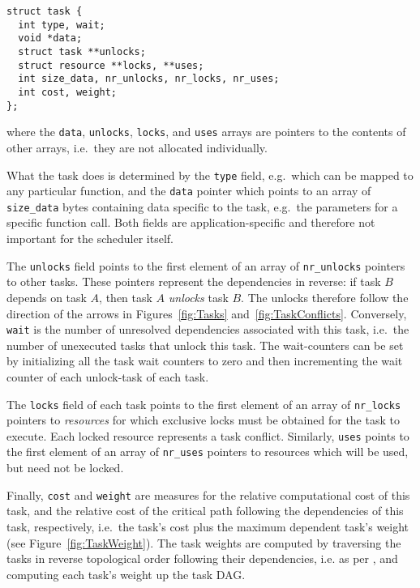 \documentclass[preprint]{elsarticle}
\newcommand{\fig}[1]
    {Figure~\ref{fig:#1}}
\newcommand{\figs}[2]
    {Figures~\ref{fig:#1} and~\ref{fig:#2}}
\begin{document}
\begin{center}\begin{minipage}{0.9\textwidth}
    \begin{lstlisting}
struct task {
  int type, wait;
  void *data;
  struct task **unlocks;
  struct resource **locks, **uses;
  int size_data, nr_unlocks, nr_locks, nr_uses;
  int cost, weight;
};
    \end{lstlisting}
\end{minipage}\end{center}
\noindent where the {\tt data}, {\tt unlocks}, {\tt locks},
and {\tt uses} arrays are pointers to the contents of other
arrays, i.e.~they are not allocated individually.

What the task does is determined by the {\tt type}
field, e.g.~which can be mapped to any particular function,
and the {\tt data} pointer which points to an array of
{\tt size\_data} bytes containing data specific to the task,
e.g.~the parameters for a specific function call.
Both fields are application-specific and therefore not
important for the scheduler itself.

The {\tt unlocks} field points to the first element of
an array of {\tt nr\_unlocks} pointers to other tasks.
These pointers represent the dependencies in reverse:
if task $B$ depends on task $A$, then task $A$ {\em unlocks}
task $B$.
The unlocks therefore follow the direction of the arrows
in \figs{Tasks}{TaskConflicts}.
Conversely, {\tt wait} is the number of unresolved dependencies
associated with this task, i.e.~the number of unexecuted tasks
that unlock this task.
The wait-counters can
be set by initializing all the task wait counters to zero and then
incrementing the wait counter of each unlock-task of each task.

The {\tt locks} field of each task points to the first element of
an array of {\tt nr\_locks} pointers to {\em resources}
for which exclusive locks must be obtained for the task
to execute.
Each locked resource represents a task conflict.
Similarly, {\tt uses} points to the first element of
an array of {\tt nr\_uses} pointers to resources which
will be used, but need not be locked.

Finally, {\tt cost} and {\tt weight} are measures
for the relative computational cost of this task, and the
relative cost of the critical path following the
dependencies of this task, respectively, i.e.~the task's cost
plus the maximum dependent task's weight (see \fig{TaskWeight}).
The task weights are computed by traversing
the tasks in reverse topological order following their dependencies, i.e.
as per \cite{ref:Kahn1962}, and computing each task's weight
up the task DAG.
\end{document}

